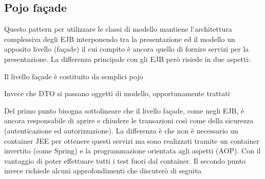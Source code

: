 \subsection{Pojo façade}
Questo pattern per utilizzare le classi di modello mantiene l'architettura complessiva degli EJB interponendo tra la presentazione ed il modello un apposito livello (façade) il cui compito è ancora quello di fornire servizi per la presentazione. La differenza principale con gli EJB però risiede in due aspetti:
\begin{enumerate*}
  \item  Il livello façade è costituito da semplici pojo
  \item Invece che DTO si passano oggetti di modello, opportunamente trattati
\end{enumerate*}

Del primo punto bisogna sottolineare che il livello façade, come negli EJB, è ancora responsabile di aprire e chiudere le transazioni così come della sicurezza (autenticazione ed autorizzazione). La differenza è che non è necessario un container JEE per ottenere questi servizi ma sono realizzati tramite un container invertito (come Spring) e la programmazione orientata agli aspetti (AOP). Con il vantaggio di poter effettuare tutti i test fuori dal container.
Il secondo punto invece richiede alcuni approfondimenti che discuterò di seguito.

